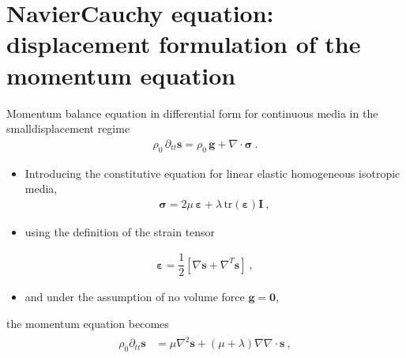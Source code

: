 \documentclass[letterpaper,10pt,english]{jupyterBook}
\begin{document}
\section{Navier\sphinxhyphen{}Cauchy equation: displacement formulation of the momentum equation}
\label{\detokenize{ch/solids/small-displacements-waves:navier-cauchy-equation-displacement-formulation-of-the-momentum-equation}}
\sphinxAtStartPar
Momentum balance equation in differential form for continuous media in the small\sphinxhyphen{}displacement regime
\begin{equation*}
\begin{split}\rho_0 \, \partial_{tt} \mathbf{s} = \rho_0 \, \mathbf{g} + \nabla \cdot \boldsymbol{\sigma} \ .\end{split}
\end{equation*}\begin{itemize}
\item {} 
\sphinxAtStartPar
Introducing the constitutive equation for linear elastic homogeneous isotropic media,
\begin{equation*}
\begin{split}\boldsymbol{\sigma} = 2 \mu \, \boldsymbol{\varepsilon} + \lambda \, \text{tr} \left( \boldsymbol{\varepsilon} \right) \mathbf{I} \ ,\end{split}
\end{equation*}
\item {} 
\sphinxAtStartPar
using the definition of the strain tensor

\end{itemize}
\begin{equation*}
\begin{split}\boldsymbol{\varepsilon} = \dfrac{1}{2} \left[ \nabla \mathbf{s} + \nabla^T \mathbf{s} \right] \ ,\end{split}
\end{equation*}\begin{itemize}
\item {} 
\sphinxAtStartPar
and under the assumption of no volume force \(\mathbf{g} = \mathbf{0}\),

\end{itemize}

\sphinxAtStartPar
the momentum equation becomes
\begin{equation*}
\begin{split}\begin{aligned}
  \rho_0 \partial_{tt} \mathbf{s} & = \mu \nabla^2 \mathbf{s} + \left( \mu +\lambda \right) \nabla \nabla \cdot \mathbf{s} \ ,
\end{aligned}\end{split}
\end{equation*}
\end{document}
